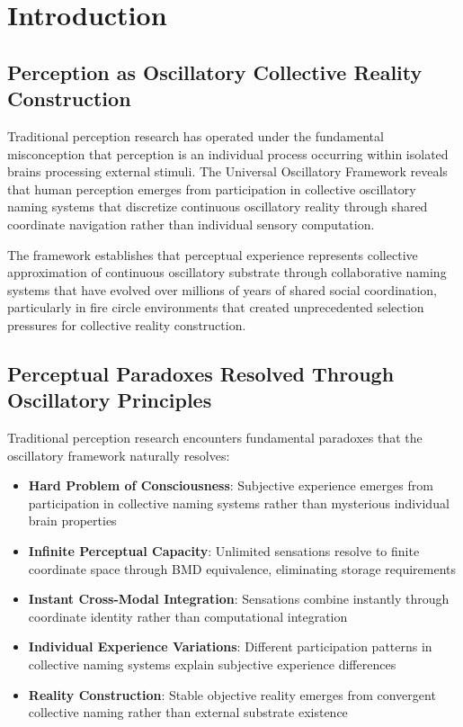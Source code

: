 \documentclass[12pt,a4paper]{article}
\begin{document}
\section{Introduction}

\subsection{Perception as Oscillatory Collective Reality Construction}

Traditional perception research has operated under the fundamental misconception that perception is an individual process occurring within isolated brains processing external stimuli. The Universal Oscillatory Framework \cite{sachikonye2024mathematical,sachikonye2024physical} reveals that human perception emerges from participation in collective oscillatory naming systems that discretize continuous oscillatory reality through shared coordinate navigation rather than individual sensory computation.

The framework establishes that perceptual experience represents collective approximation of continuous oscillatory substrate through collaborative naming systems that have evolved over millions of years of shared social coordination, particularly in fire circle environments that created unprecedented selection pressures for collective reality construction.

\subsection{Perceptual Paradoxes Resolved Through Oscillatory Principles}

Traditional perception research encounters fundamental paradoxes that the oscillatory framework naturally resolves:

\begin{itemize}
\item \textbf{Hard Problem of Consciousness}: Subjective experience emerges from participation in collective naming systems rather than mysterious individual brain properties
\item \textbf{Infinite Perceptual Capacity}: Unlimited sensations resolve to finite coordinate space through BMD equivalence, eliminating storage requirements
\item \textbf{Instant Cross-Modal Integration}: Sensations combine instantly through coordinate identity rather than computational integration
\item \textbf{Individual Experience Variations}: Different participation patterns in collective naming systems explain subjective experience differences
\item \textbf{Reality Construction}: Stable objective reality emerges from convergent collective naming rather than external substrate existence
\end{itemize}
\end{document}
